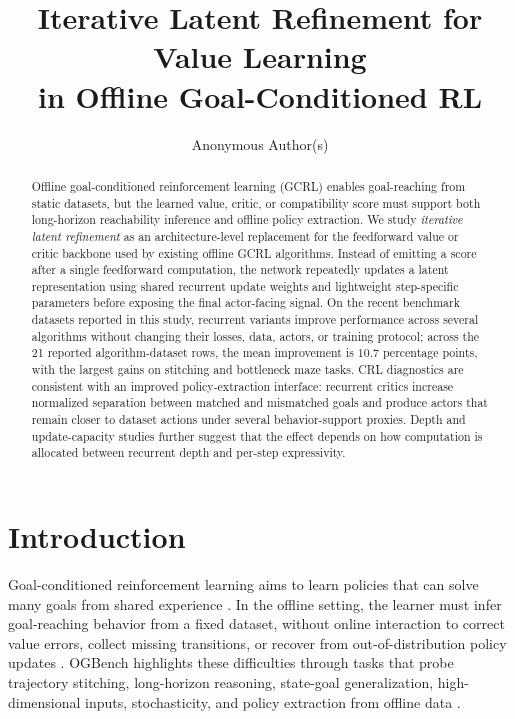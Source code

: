 \documentclass{article}
\title{Iterative Latent Refinement for Value Learning \\in Offline Goal-Conditioned RL}
\author{Anonymous Author(s)}
\begin{document}
\maketitle


\begin{abstract}
Offline goal-conditioned reinforcement learning (GCRL) enables goal-reaching from static datasets, but the learned value, critic, or compatibility score must support both long-horizon reachability inference and offline policy extraction.
We study \emph{iterative latent refinement} as an architecture-level replacement for the feedforward value or critic backbone used by existing offline GCRL algorithms.
Instead of emitting a score after a single feedforward computation, the network repeatedly updates a latent representation using shared recurrent update weights and lightweight step-specific parameters before exposing the final actor-facing signal.
On the recent benchmark datasets reported in this study, recurrent variants improve performance across several algorithms without changing their losses, data, actors, or training protocol; across the 21 reported algorithm-dataset rows, the mean improvement is $10.7$ percentage points, with the largest gains on stitching and bottleneck maze tasks.
CRL diagnostics are consistent with an improved policy-extraction interface: recurrent critics increase normalized separation between matched and mismatched goals and produce actors that remain closer to dataset actions under several behavior-support proxies.
Depth and update-capacity studies further suggest that the effect depends on how computation is allocated between recurrent depth and per-step expressivity.
\end{abstract}

\section{Introduction}
Goal-conditioned reinforcement learning aims to learn policies that can solve many goals from shared experience \citep{uvfa, her, gcsl}. In the offline setting, the learner must infer goal-reaching behavior from a fixed dataset, without online interaction to correct value errors, collect missing transitions, or recover from out-of-distribution policy updates \citep{cql, iql, td3bc}. OGBench highlights these difficulties through tasks that probe trajectory stitching, long-horizon reasoning, state-goal generalization, high-dimensional inputs, stochasticity, and policy extraction from offline data \citep{ogbench}.
\end{document}
